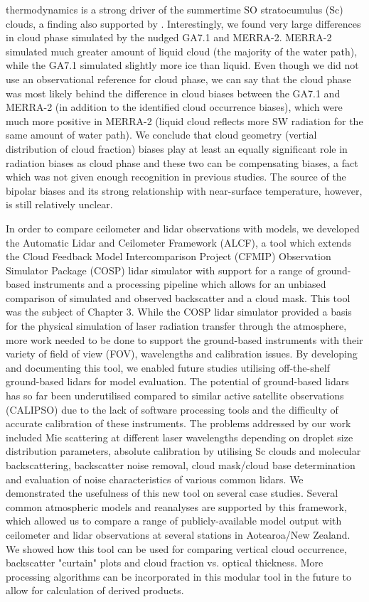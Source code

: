 thermodynamics is a strong driver of the summertime SO stratocumulus (Sc) clouds,
a finding also supported by \cite{hartery2020b}. Interestingly, we found
very large differences in cloud phase simulated by the nudged GA7.1 and MERRA-2.
MERRA-2 simulated much greater amount of liquid cloud (the majority of
the water path), while the GA7.1 simulated slightly more ice than liquid.
Even though we did not use an observational reference for cloud phase,
we can say that the cloud phase was most likely behind the difference in
cloud biases between the GA7.1 and MERRA-2 (in addition to the identified cloud occurrence biases), which were much more positive
in MERRA-2 (liquid cloud reflects more SW radiation for the same amount of water
path). We conclude that cloud geometry (vertial distribution of cloud fraction)
biases play at least an equally
significant role in radiation biases as cloud phase and these two can be
compensating biases, a fact which was not given enough recognition in previous
studies. The source of the bipolar biases and its strong relationship with
near-surface temperature, however, is still relatively unclear.

In order to compare ceilometer and lidar observations with models,
we developed the Automatic Lidar and Ceilometer Framework (ALCF),
a tool which extends the Cloud Feedback Model Intercomparison Project (CFMIP) Observation Simulator Package (COSP) lidar simulator with support for a range
of ground-based instruments and a processing pipeline which allows
for an unbiased comparison of simulated and observed backscatter and a cloud mask.
This tool was the subject of Chapter 3. While the COSP lidar simulator
provided a basis for the physical simulation of laser radiation transfer
through the atmosphere, more work needed to be done to support the ground-based
instruments with their variety of field of view (FOV), wavelengths and
calibration issues. By developing and documenting this tool, we enabled future
studies utilising off-the-shelf ground-based lidars for model evaluation.
The potential of ground-based lidars has so far been underutilised compared
to similar active satellite observations (CALIPSO) due to the
lack of software processing tools and the difficulty of accurate calibration
of these instruments. The problems addressed by our work included Mie
scattering at different laser wavelengths depending on droplet size distribution
parameters, absolute calibration by utilising Sc clouds and molecular
backscattering, backscatter noise removal, cloud mask/cloud base determination 
and evaluation of noise characteristics of various common lidars. We demonstrated
the
usefulness of this new tool on several case studies. Several common atmospheric
models and reanalyses are supported by this framework, which allowed us to compare
a range of publicly-available model output with ceilometer and lidar observations
at several stations in Aotearoa/New Zealand. We showed how this tool can be used
for comparing vertical cloud occurrence, backscatter "curtain" plots
and cloud fraction vs. optical thickness. More processing algorithms can
be incorporated in this modular tool in the future to allow for calculation of
derived products.

